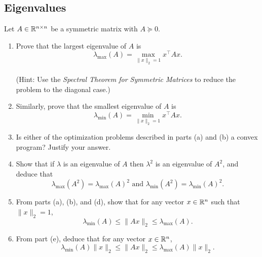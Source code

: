 \newpage
\subsection{Eigenvalues}
Let $A \in \mathbb{R}^{n\times n}$ be a symmetric matrix with $A \succeq 0$.
\begin{enumerate}[label=(\alph*)]
    \item Prove that the largest eigenvalue of $A$ is $$\lambda_{\max}(A) = \max_{\lVert x \rVert_2 = 1} x^{\top} Ax.$$ \\
    (Hint: Use the \emph{Spectral Theorem for Symmetric Matrices} to reduce the problem to the diagonal case.)
    \begin{mdframed} \solution
    \end{mdframed}

    \item Similarly, prove that the smallest eigenvalue of $A$ is $$\lambda_{\min}(A) = \min_{\lVert x\rVert_2 = 1} x^{\top} Ax.$$
    \begin{mdframed}
    \solution %
    \end{mdframed}

    \item Is either of the optimization problems described in parts (a) and (b) a convex program? Justify your answer.
    \begin{mdframed}
    \solution %
    \end{mdframed}

    \item Show that if $\lambda$ is an eigenvalue of $A$ then $\lambda^2$ is an eigenvalue of $A^2$, and deduce that $$\lambda_{\max}(A^2) = \lambda_{\max}(A)^2 \text{ and } \lambda_{\min}(A^2) = \lambda_{\min}(A)^2.$$
    \begin{mdframed}
    \solution %
    \end{mdframed}

    \item From parts (a), (b), and (d), show that for any vector $x \in \mathbb{R}^n$ such that $\lVert x \rVert_2 = 1$, $$\lambda_{\min}(A) \leq \lVert Ax \rVert_2 \leq \lambda_{\max}(A).$$
    \begin{mdframed}
    \solution %
    \end{mdframed}

    \item From part (e), deduce that for any vector $x \in \mathbb{R}^n$, $$\lambda_{\min}(A) \lVert x \rVert_2 \leq \lVert Ax \rVert_2 \leq \lambda_{\max}(A)\lVert x \rVert_2.$$
    \begin{mdframed}
    \solution %
    \end{mdframed}
\end{enumerate}

